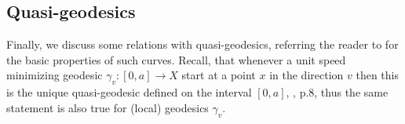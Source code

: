 \documentclass[12pt,leqno]{amsart}
\numberwithin{equation}{section}
\theoremstyle{definition}
\theoremstyle{remark}
\newcommand{\pref}[1]{Proposition~\ref{#1}}
\newcommand{\lref}[1]{Lemma~\ref{#1}}
\newcommand{\vol}{\mathrm{vol}}
\begin{document}














\subsection{Quasi-geodesics} \label{subsec:quasi}
Finally, we discuss some relations with quasi-geodesics, referring the reader to \cite{Petsemi} for the basic properties of such curves.
Recall, that whenever a unit speed minimizing   geodesic $\gamma _v :[0,a] \to X$   start at a point $x$ in the direction $v$ then this is the unique quasi-geodesic defined on the interval $[0,a]$, \cite{PP}, p.8, thus the same statement is also true for  (local) geodesics $\gamma _v$.
\end{document}

